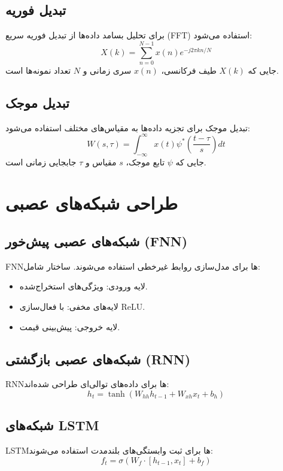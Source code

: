 \subsection{تبدیل فوریه}
برای تحلیل بسامد داده‌ها از تبدیل فوریه سریع (FFT) استفاده می‌شود:
\begin{equation}
	X(k) = \sum_{n=0}^{N-1} x(n) e^{-j2\pi kn/N}
\end{equation}
جایی که \(X(k)\) طیف فرکانسی، \(x(n)\) سری زمانی و \(N\) تعداد نمونه‌ها است.

\subsection{تبدیل موجک}
تبدیل موجک برای تجزیه داده‌ها به مقیاس‌های مختلف استفاده می‌شود:
\begin{equation}
	W(s,\tau) = \int_{-\infty}^{\infty} x(t) \psi^*\left(\frac{t-\tau}{s}\right) dt
\end{equation}
جایی که \(\psi\) تابع موجک، \(s\) مقیاس و \(\tau\) جابجایی زمانی است.

\section{طراحی شبکه‌های عصبی}
\label{sec:neural_networks}

\subsection{شبکه‌های عصبی پیش‌خور (FNN)}
FNN‌ها برای مدل‌سازی روابط غیرخطی استفاده می‌شوند. ساختار شامل:
\begin{itemize}
	\item لایه ورودی: ویژگی‌های استخراج‌شده.
	\item لایه‌های مخفی: با فعال‌سازی ReLU.
	\item لایه خروجی: پیش‌بینی قیمت.
\end{itemize}

\subsection{شبکه‌های عصبی بازگشتی (RNN)}
RNN‌ها برای داده‌های توالی‌ای طراحی شده‌اند:
\begin{equation}
	h_t = \tanh(W_{hh}h_{t-1} + W_{xh}x_t + b_h)
\end{equation}

\subsection{شبکه‌های LSTM}
LSTM‌ها برای ثبت وابستگی‌های بلندمدت استفاده می‌شوند:
\begin{equation}
	f_t = \sigma(W_f \cdot [h_{t-1}, x_t] + b_f)
\end{equation}

